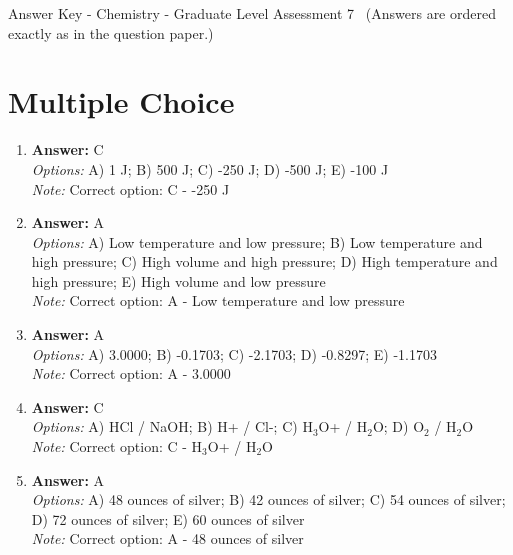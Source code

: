 \documentclass[12pt]{article}
\begin{document}
\begin{center}
Answer Key - Chemistry - Graduate Level Assessment 7 \
\small (Answers are ordered exactly as in the question paper.)
\end{center}

\section*{Multiple Choice}
\begin{enumerate}[label=\arabic*.]
\item \textbf{Answer:} C
\\ \textit{Options:} A) 1 J; B) 500 J; C) -250 J; D) -500 J; E) -100 J
\\ \textit{Note:} Correct option: C - -250 J
\item \textbf{Answer:} A
\\ \textit{Options:} A) Low temperature and low pressure; B) Low temperature and high pressure; C) High volume and high pressure; D) High temperature and high pressure; E) High volume and low pressure
\\ \textit{Note:} Correct option: A - Low temperature and low pressure
\item \textbf{Answer:} A
\\ \textit{Options:} A) 3.0000; B) -0.1703; C) -2.1703; D) -0.8297; E) -1.1703
\\ \textit{Note:} Correct option: A - 3.0000
\item \textbf{Answer:} C
\\ \textit{Options:} A) HCl / NaOH; B) H+ / Cl-; C) H$_{3}$O+ / H$_{2}$O; D) O$_{2}$ / H$_{2}$O
\\ \textit{Note:} Correct option: C - H$_{3}$O+ / H$_{2}$O
\item \textbf{Answer:} A
\\ \textit{Options:} A) 48 ounces of silver; B) 42 ounces of silver; C) 54 ounces of silver; D) 72 ounces of silver; E) 60 ounces of silver
\\ \textit{Note:} Correct option: A - 48 ounces of silver
\end{enumerate}
\end{document}

